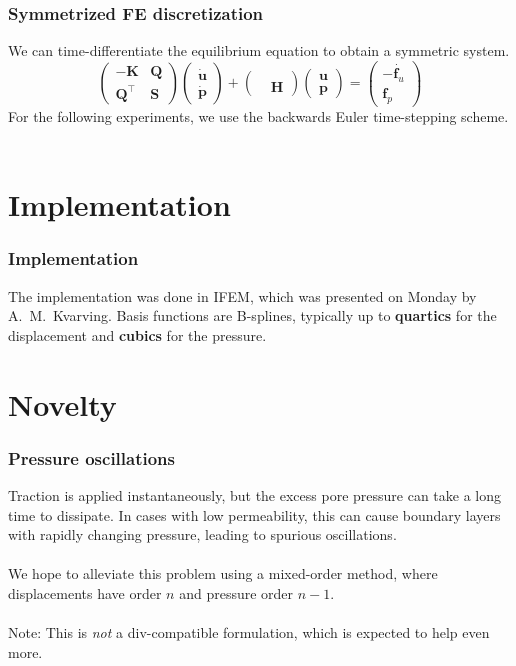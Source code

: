 \documentclass{beamer}
\begin{document}
\begin{frame}
  \frametitle{Symmetrized FE discretization}

  We can time-differentiate the equilibrium equation to obtain a symmetric system.
  \[
    \begin{pmatrix} -\bm{K} & \bm{Q} \\ \bm{Q}^\intercal & \bm{S} \end{pmatrix}
    \begin{pmatrix} \dot{\bm{u}} \\ \dot{\bm{p}} \end{pmatrix} +
    \begin{pmatrix} & \\ & \bm{H} \end{pmatrix}
    \begin{pmatrix} \bm{u} \\ \bm{p} \end{pmatrix} =
    \begin{pmatrix} -\dot{\bm{f}_u} \\ \bm{f}_p \end{pmatrix}
  \]
  For the following experiments, we use the backwards Euler time-stepping
  scheme. \\~\\

\end{frame}

\section{Implementation}

\begin{frame}
  \frametitle{Implementation}

  The implementation was done in IFEM, which was presented on Monday by
  A.~M.~Kvarving. Basis functions are B-splines, typically up to
  \textbf{quartics} for the displacement and \textbf{cubics} for the pressure.
\end{frame}

\section{Novelty}

\begin{frame}
  \frametitle{Pressure oscillations}

  Traction is applied instantaneously, but the excess pore pressure can take a
  long time to dissipate. In cases with low permeability, this can cause boundary
  layers with rapidly changing pressure, leading to spurious oscillations. \\~\\

  We hope to alleviate this problem using a mixed-order method, where
  displacements have order $n$ and pressure order $n-1$. \\~\\

  Note: This is \emph{not} a div-compatible formulation, which is expected to
  help even more. 
\end{frame}
\end{document}
